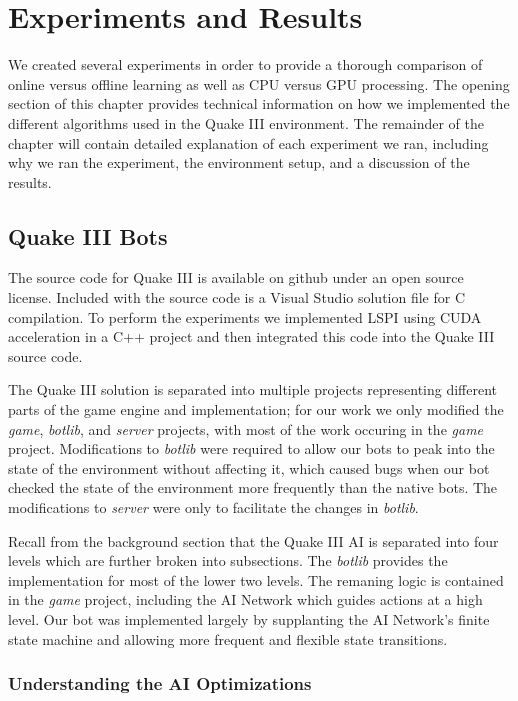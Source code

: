\chapter{Experiments and Results}

We created several experiments in order to provide a thorough comparison of online versus offline learning as well as CPU versus GPU processing. The opening section of this chapter provides technical information on how we implemented the different algorithms used in the Quake III environment. The remainder of the chapter will contain detailed explanation of each experiment we ran, including why we ran the experiment, the environment setup, and a discussion of the results.

\section{Quake III Bots}

The source code for Quake III is available on github under an open source license. \cite{q3code} Included with the source code is a Visual Studio solution file for C compilation. To perform the experiments we implemented LSPI using CUDA acceleration in a C++ project and then integrated this code into the Quake III source code.

The Quake III solution is separated into multiple projects representing different parts of the game engine and implementation; for our work we only modified the \emph{game}, \emph{botlib}, and \emph{server} projects, with most of the work occuring in the \emph{game} project. Modifications to \emph{botlib} were required to allow our bots to peak into the state of the environment without affecting it, which caused bugs when our bot checked the state of the environment more frequently than the native bots. The modifications to \emph{server} were only to facilitate the changes in \emph{botlib}.

Recall from the background section that the Quake III AI is separated into four levels which are further broken into subsections. The \emph{botlib} provides the implementation for most of the lower two levels. The remaning logic is contained in the \emph{game} project, including the AI Network which guides actions at a high level. Our bot was implemented largely by supplanting the AI Network's finite state machine and allowing more frequent and flexible state transitions.

\subsection{Understanding the AI Optimizations}

